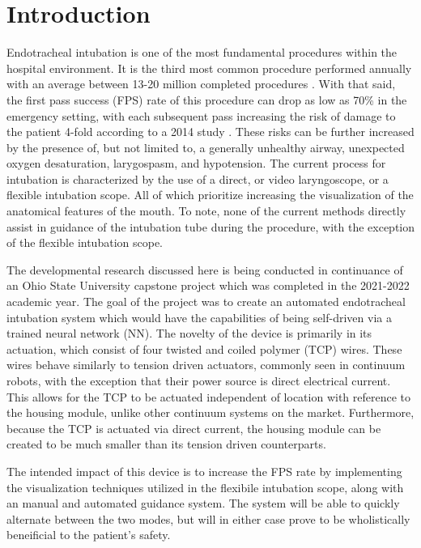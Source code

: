\section{Introduction}
\label{sect:introduction}

Endotracheal intubation is one of the most fundamental procedures within the hospital environment. It is the third most common procedure performed annually with an average between 13-20 million completed procedures \cite{hemmerling_first_2012}. With that said, the first pass success (FPS) rate of this procedure can drop as low as 70\% in the emergency setting, with each subsequent pass increasing the risk of damage to the patient 4-fold according to a 2014 study \cite{bernhard_first_2015}. These risks can be further increased by the presence of, but not limited to, a generally unhealthy airway, unexpected oxygen desaturation, larygospasm, and hypotension. The current process for intubation is characterized by the use of a direct, or video laryngoscope, or a flexible intubation scope. All of which prioritize increasing the visualization of the anatomical features of the mouth. To note, none of the current methods directly assist in guidance of the intubation tube during the procedure, with the exception of the flexible intubation scope.

The developmental research discussed here is being conducted in continuance of an Ohio State University capstone project which was completed in the 2021-2022 academic year. The goal of the project was to create an automated endotracheal intubation system which would have the capabilities of being self-driven via a trained neural network (NN). The novelty of the device is primarily in its actuation, which consist of four twisted and coiled polymer (TCP) wires. These wires behave similarly to tension driven actuators, commonly seen in continuum robots, with the exception that their power source is direct electrical current. This allows for the TCP to be actuated independent of location with reference to the housing module, unlike other continuum systems on the market. Furthermore, because the TCP is actuated via direct current, the housing module can be created to be much smaller than its tension driven counterparts.

The intended impact of this device is to increase the FPS rate by implementing the visualization techniques utilized in the flexibile intubation scope, along with an manual and automated guidance system. The system will be able to quickly alternate between the two modes, but will in either case prove to be wholistically beneificial to the patient's safety.